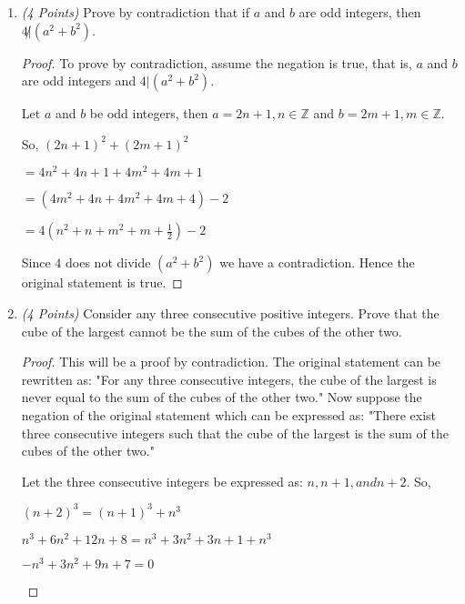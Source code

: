 \documentclass[10pt]{article} %
\newcommand{\Z}{\mathbb{Z}}
\newcommand{\points}[1]{{\it (#1 Points)}}
\begin{document}
\begin{enumerate}
\begin{enumerate}
  \bigskip
  
\end{enumerate}

\item \points{4} Prove by contradiction that if $a$ and $b$ are odd integers, then $4 \not | (a^2+b^2)$.

\bigskip

\begin{proof} To prove by contradiction, assume the negation is true, that is, $a$ and $b$ are odd integers and $4|(a^2 + b^2)$.  

Let $a$ and $b$ be odd integers, then $a = 2n+1, n\in \Z$ and $b = 2m+1, m \in \Z$.  

So, $(2n+1)^2 + (2m+1)^2$

$ = 4n^2 + 4n + 1 + 4m^2 + 4m + 1$

$ = (4m^2 + 4n + 4m^2 + 4m + 4) - 2$

$ = 4(n^2 + n + m^2 + m + \frac{1}{2}) - 2$

Since $4$ does not divide $(a^2 + b^2)$ we have a contradiction.  Hence the original statement is true.  
\end{proof}

\bigskip

\item \points{4} Consider any three consecutive positive integers. Prove that the cube of the largest cannot be the sum of the cubes of the other two.

\bigskip

\begin{proof} This will be a proof by contradiction.  The original statement can be rewritten as: "For any three consecutive integers, the cube of the largest is never equal to the sum of the cubes of the other two."  Now suppose the negation of the original statement which can be expressed as: "There exist three consecutive integers such that the cube of the largest is the sum of the cubes of the other two."  

Let the three consecutive integers be expressed as: $n, n+1, and n+2$.  So, 
\begin{center} $(n+2)^3 = (n+1)^3 + n^3$ \end{center}

\begin{center} $n^3 + 6n^2 + 12n + 8 = n^3 + 3n^2 + 3n + 1 + n^3$ \end{center}

\begin{center} $-n^3 + 3n^2 + 9n + 7 = 0$ \end{center}


\end{proof}
\end{enumerate}
\end{document}
